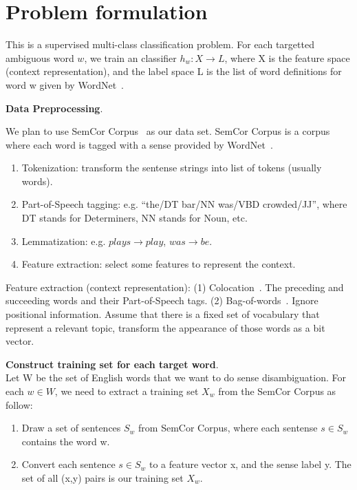 \section{Problem formulation}

This is a supervised multi-class classification problem. For each targetted
ambiguous word $w$, we train an classifier $h_w: X \rightarrow L$, where X is
the feature space (context representation), and the label space L is the list of
word definitions for word w given by WordNet~\cite{wordnet}.

\textbf{Data Preprocessing}.

We plan to use SemCor Corpus~\cite{semcor} as our data set. SemCor Corpus is a
corpus where each word is tagged with a sense provided by WordNet~\cite{wordnet}.

\begin{enumerate}
  \item Tokenization: transform the sentense strings into list of tokens
    (usually words).
  \item Part-of-Speech tagging: e.g. ``the/DT bar/NN was/VBD crowded/JJ'', where
    DT stands for Determiners, NN stands for Noun, etc.
  \item Lemmatization: e.g. $plays \rightarrow play$, $was \rightarrow be$.
  \item Feature extraction: select some features to represent the context.
\end{enumerate}

Feature extraction (context representation): 
(1) Colocation~\cite{colocation}. The preceding and succeeding words and their
Part-of-Speech tags.  (2) Bag-of-words~\cite{bagofwords}. Ignore positional
information. Assume that there is a fixed set of vocabulary that represent a
relevant topic, transform the appearance of those words as a bit vector.

\textbf{Construct training set for each target word}.\\
Let W be the set of English words that we want to do sense disambiguation. For
each $w \in W$, we need to extract a training set $X_w$ from the SemCor Corpus
as follow: 
\begin{enumerate}
  \item Draw a set of sentences $S_w$ from SemCor Corpus, where each sentense
$s \in S_w$ contains the word w. 
  \item Convert each sentence $s \in S_w$ to a feature vector x, and the sense
    label y. The set of all (x,y) pairs is our training set $X_w$.
\end{enumerate}

